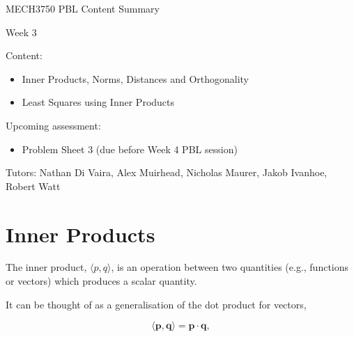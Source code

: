 \documentclass[12pt]{article}
\begin{document}
\begin{center}
{\Huge   MECH3750 PBL Content Summary}

\vspace{6mm}

{\Huge  Week 3}

\end{center}

\vspace{6mm}

{\Large Content:}
{\begin{itemize}
	\item Inner Products, Norms, Distances and Orthogonality
	\item Least Squares using Inner Products
\end{itemize}}

\vspace{4mm}

{\Large Upcoming assessment:}
{\begin{itemize}
	\item Problem Sheet 3 (due before Week 4 PBL session)
\end{itemize}}

\vspace{4mm}

{Tutors: Nathan Di Vaira, Alex Muirhead, Nicholas Maurer, Jakob Ivanhoe, Robert Watt}


\pagebreak

\section{Inner Products}

\vspace{4mm}

The inner product, $ \langle p,q \rangle $, is an operation between two quantities (e.g., functions or vectors) which produces a scalar quantity.

\vspace{4mm}

It can be thought of as a generalisation of the dot product for vectors,

\vspace{2mm}

$$ \langle \mathbf{p},\mathbf{q} \rangle = \mathbf{p} \cdot \mathbf{q}, $$

\vspace{4mm}
\end{document}

